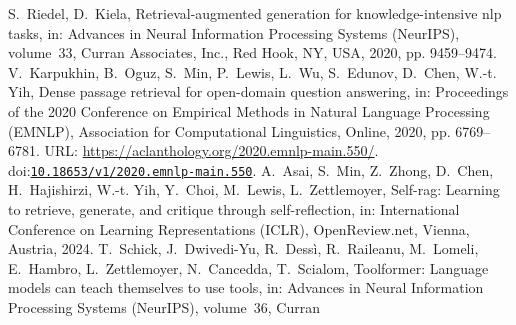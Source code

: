 \documentclass[10pt,a4paper]{article}
\providecommand{\bibinfo}[2]{#2}
\providecommand{\DOIprefix}{doi:}
\providecommand{\URLprefix}{URL: }
\providecommand{\doi}[1]{\href{https://doi.org/#1}{\nolinkurl{#1}}}
\begin{document}
\begin{thebibliography}{25}
  \bibinfo{author}{S.~Riedel}, \bibinfo{author}{D.~Kiela},
\newblock \bibinfo{title}{Retrieval-augmented generation for
  knowledge-intensive nlp tasks},
\newblock in: \bibinfo{booktitle}{Advances in Neural Information Processing
  Systems (NeurIPS)}, volume~\bibinfo{volume}{33}, \bibinfo{publisher}{Curran
  Associates, Inc.}, \bibinfo{address}{Red Hook, NY, USA},
  \bibinfo{year}{2020}, pp. \bibinfo{pages}{9459--9474}.
\bibinfo{author}{V.~Karpukhin}, \bibinfo{author}{B.~Oguz},
  \bibinfo{author}{S.~Min}, \bibinfo{author}{P.~Lewis},
  \bibinfo{author}{L.~Wu}, \bibinfo{author}{S.~Edunov},
  \bibinfo{author}{D.~Chen}, \bibinfo{author}{W.-t. Yih},
\newblock \bibinfo{title}{Dense passage retrieval for open-domain question
  answering},
\newblock in: \bibinfo{booktitle}{Proceedings of the 2020 Conference on
  Empirical Methods in Natural Language Processing (EMNLP)},
  \bibinfo{publisher}{Association for Computational Linguistics},
  \bibinfo{address}{Online}, \bibinfo{year}{2020}, pp.
  \bibinfo{pages}{6769--6781}. \URLprefix
  \url{https://aclanthology.org/2020.emnlp-main.550/}.
  \DOIprefix\doi{10.18653/v1/2020.emnlp-main.550}.
\bibinfo{author}{A.~Asai}, \bibinfo{author}{S.~Min},
  \bibinfo{author}{Z.~Zhong}, \bibinfo{author}{D.~Chen},
  \bibinfo{author}{H.~Hajishirzi}, \bibinfo{author}{W.-t. Yih},
  \bibinfo{author}{Y.~Choi}, \bibinfo{author}{M.~Lewis},
  \bibinfo{author}{L.~Zettlemoyer},
\newblock \bibinfo{title}{Self-rag: Learning to retrieve, generate, and
  critique through self-reflection},
\newblock in: \bibinfo{booktitle}{International Conference on Learning
  Representations (ICLR)}, \bibinfo{publisher}{OpenReview.net},
  \bibinfo{address}{Vienna, Austria}, \bibinfo{year}{2024}.
\bibinfo{author}{T.~Schick}, \bibinfo{author}{J.~Dwivedi-Yu},
  \bibinfo{author}{R.~Dess{\`i}}, \bibinfo{author}{R.~Raileanu},
  \bibinfo{author}{M.~Lomeli}, \bibinfo{author}{E.~Hambro},
  \bibinfo{author}{L.~Zettlemoyer}, \bibinfo{author}{N.~Cancedda},
  \bibinfo{author}{T.~Scialom},
\newblock \bibinfo{title}{Toolformer: Language models can teach themselves to
  use tools},
\newblock in: \bibinfo{booktitle}{Advances in Neural Information Processing
  Systems (NeurIPS)}, volume~\bibinfo{volume}{36}, \bibinfo{publisher}{Curran
}
\end{thebibliography}
\end{document}
